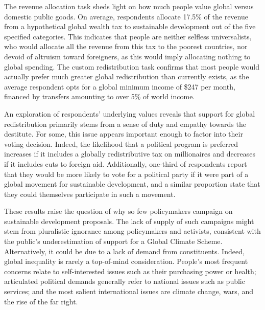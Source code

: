 \documentclass[12pt,english]{article}
\begin{document}
The revenue allocation task sheds light on how much people value global versus domestic public goods. On average, respondents allocate 17.5\% of the revenue from a hypothetical global wealth tax to sustainable development out of the five specified categories. 
This indicates that people are neither selfless universalists, who would allocate all the revenue from this tax to the poorest countries, nor devoid of altruism toward foreigners, as this would imply allocating nothing to global spending. 
The custom redistribution task confirms that most people would actually prefer much greater global redistribution than currently exists, as the average respondent opts for a global minimum income of \$247 per month, financed by transfers amounting to over 5\% of world income. 

An exploration of respondents' underlying values reveals that support for global redistribution primarily stems from a sense of duty and empathy towards the destitute. For some, this issue appears important enough to factor into their voting decision. Indeed, the likelihood that a political program is preferred increases if it includes a globally redistributive tax on millionaires and decreases if it includes cuts to foreign aid. Additionally, one-third of respondents report that they would be more likely to vote for a political party if it were part of a global movement for sustainable development, and a similar proportion state that they could themselves participate in such a movement. 

These results raise the question of why so few policymakers campaign on sustainable development proposals. The lack of supply of such campaigns might stem from pluralistic ignorance among policymakers and activists, consistent with the public's underestimation of support for a Global Climate Scheme. %
Alternatively, it could be due to a lack of demand from constituents. Indeed, global inequality is rarely a top-of-mind consideration. People's most frequent concerns relate to self-interested issues such as their purchasing power or health; articulated political demands generally refer to national issues such as public services; and the most salient international issues are climate change, wars, and the rise of the far right. %
\end{document}
